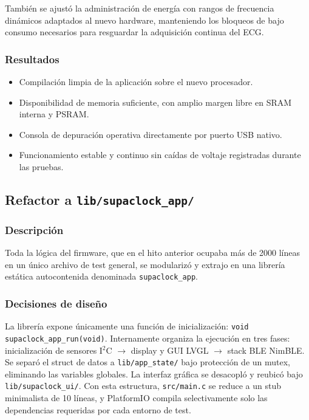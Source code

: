 \documentclass[letterpaper,11pt]{article}
\begin{document}
También se ajustó la administración de energía con rangos de frecuencia dinámicos adaptados al nuevo hardware, manteniendo los bloqueos de bajo consumo necesarios para resguardar la adquisición continua del ECG.

\subsubsection{Resultados}

\begin{itemize}
    \item Compilación limpia de la aplicación sobre el nuevo procesador.
    \item Disponibilidad de memoria suficiente, con amplio margen libre en SRAM interna y PSRAM.
    \item Consola de depuración operativa directamente por puerto USB nativo.
    \item Funcionamiento estable y continuo sin caídas de voltaje registradas durante las pruebas.
\end{itemize}

\subsection{Refactor a \texttt{lib/supaclock\_app/}}

\subsubsection{Descripción}

Toda la lógica del firmware, que en el hito anterior ocupaba más de 2000 líneas en un único archivo de test general, se modularizó y extrajo en una librería estática autocontenida denominada \texttt{supaclock\_app}.

\subsubsection{Decisiones de diseño}

La librería expone únicamente una función de inicialización: \texttt{void supaclock\_app\_run(void)}. Internamente organiza la ejecución en tres fases: inicialización de sensores I$^2$C $\to$ display y GUI LVGL $\to$ stack BLE NimBLE. Se separó el struct de datos a \texttt{lib/app\_state/} bajo protección de un mutex, eliminando las variables globales. La interfaz gráfica se desacopló y reubicó bajo \texttt{lib/supaclock\_ui/}. Con esta estructura, \texttt{src/main.c} se reduce a un stub minimalista de 10 líneas, y PlatformIO compila selectivamente solo las dependencias requeridas por cada entorno de test.
\end{document}
